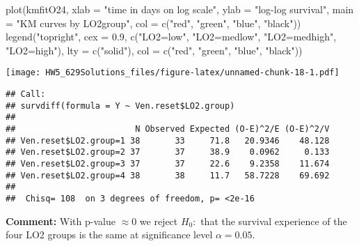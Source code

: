 \documentclass[
]{article}
\newenvironment{Shaded}{\begin{snugshade}}{\end{snugshade}}
\newcommand{\AttributeTok}[1]{\textcolor[rgb]{0.77,0.63,0.00}{#1}}
\newcommand{\CommentTok}[1]{\textcolor[rgb]{0.56,0.35,0.01}{\textit{#1}}}
\newcommand{\FloatTok}[1]{\textcolor[rgb]{0.00,0.00,0.81}{#1}}
\newcommand{\FunctionTok}[1]{\textcolor[rgb]{0.00,0.00,0.00}{#1}}
\newcommand{\NormalTok}[1]{#1}
\newcommand{\SpecialCharTok}[1]{\textcolor[rgb]{0.00,0.00,0.00}{#1}}
\newcommand{\StringTok}[1]{\textcolor[rgb]{0.31,0.60,0.02}{#1}}
\begin{document}
\begin{Shaded}
\begin{Highlighting}[]
\FunctionTok{plot}\NormalTok{(kmfitO24, }\AttributeTok{xlab =} \StringTok{"time in days on log scale"}\NormalTok{, }\AttributeTok{ylab =} \StringTok{"log{-}log survival"}\NormalTok{, }\AttributeTok{main =} \StringTok{"KM curves by LO2group"}\NormalTok{,}
    \AttributeTok{col =} \FunctionTok{c}\NormalTok{(}\StringTok{"red"}\NormalTok{, }\StringTok{"green"}\NormalTok{, }\StringTok{"blue"}\NormalTok{, }\StringTok{"black"}\NormalTok{))}
\FunctionTok{legend}\NormalTok{(}\StringTok{"topright"}\NormalTok{, }\AttributeTok{cex =} \FloatTok{0.9}\NormalTok{, }\FunctionTok{c}\NormalTok{(}\StringTok{"LO2=low"}\NormalTok{, }\StringTok{"LO2=medlow"}\NormalTok{, }\StringTok{"LO2=medhigh"}\NormalTok{, }\StringTok{"LO2=high"}\NormalTok{),}
    \AttributeTok{lty =} \FunctionTok{c}\NormalTok{(}\StringTok{"solid"}\NormalTok{), }\AttributeTok{col =} \FunctionTok{c}\NormalTok{(}\StringTok{"red"}\NormalTok{, }\StringTok{"green"}\NormalTok{, }\StringTok{"blue"}\NormalTok{, }\StringTok{"black"}\NormalTok{))}
\end{Highlighting}
\end{Shaded}

\texttt{[image: HW5\_629Solutions\_files/figure-latex/unnamed-chunk-18-1.pdf]}

\begin{Shaded}
\end{Shaded}

\begin{verbatim}
## Call:
## survdiff(formula = Y ~ Ven.reset$LO2.group)
## 
##                        N Observed Expected (O-E)^2/E (O-E)^2/V
## Ven.reset$LO2.group=1 38       33     71.8   20.9346    48.128
## Ven.reset$LO2.group=2 37       37     38.9    0.0962     0.133
## Ven.reset$LO2.group=3 37       37     22.6    9.2358    11.674
## Ven.reset$LO2.group=4 38       38     11.7   58.7228    69.692
## 
##  Chisq= 108  on 3 degrees of freedom, p= <2e-16
\end{verbatim}

\textbf{Comment:} With p-value \(\approx0\) we reject \(H_0:\) that the
survival experience of the four LO2 groups is the same at significance
level \(\alpha=0.05\).
\end{document}
